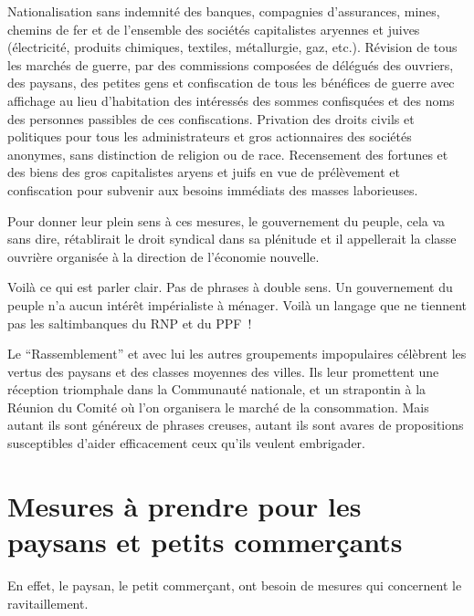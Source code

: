 \documentclass[french,twoside]{book} %
\newcommand{\bibl}[1]{{\RaggedLeft{#1}\par\bigskip}}
\newenvironment{quoteblock}%
  {\begin{quoting}}
  {\end{quoting}}
\newenvironment{quotebar}{%
    \def\FrameCommand{{\color{rubric!10!}\vrule width 0.5em} \hspace{0.9em}}%
    \def\OuterFrameSep{\itemsep} %
    \MakeFramed {\advance\hsize-\width \FrameRestore}
  }%
  {%
    \endMakeFramed
  }
\renewenvironment{quoteblock}%
  {%
    \savenotes
    \setstretch{0.9}
    \normalfont
    \begin{quotebar}
  }
  {%
    \end{quotebar}
    \spewnotes
  }
\begin{document}
\begin{quoteblock}
 \noindent Nationalisation sans indemnité des banques, compagnies d’assurances, mines, chemins de fer et de l’ensemble des sociétés capitalistes aryennes et juives (électricité, produits chimiques, textiles, métallurgie, gaz, etc.). Révision de tous les marchés de guerre, par des commissions composées de délégués des ouvriers, des paysans, des petites gens et confiscation de tous les bénéfices de guerre avec affichage au lieu d’habitation des intéressés des sommes confisquées et des noms des personnes passibles de ces confiscations. Privation des droits civils et politiques pour tous les administrateurs et gros actionnaires des sociétés anonymes, sans distinction de religion ou de race. Recensement des fortunes et des biens des gros capitalistes aryens et juifs en vue de prélèvement et confiscation pour subvenir aux besoins immédiats des masses laborieuses.\par
 
\bibl{(programme du parti communiste).}
 \end{quoteblock}

\noindent Pour donner leur plein sens à ces mesures, le gouvernement du peuple, cela va sans dire, rétablirait le droit syndical dans sa plénitude et il appellerait la classe ouvrière organisée à la direction de l’économie nouvelle.\par
Voilà ce qui est parler clair. Pas de phrases à double sens. Un gouvernement du peuple n’a aucun intérêt impérialiste à ménager. Voilà un langage que ne tiennent pas les saltimbanques du RNP et du PPF !\par
Le “Rassemblement” et avec lui les autres groupements impopulaires célèbrent les vertus des paysans et des classes moyennes des villes. Ils leur promettent une réception triomphale dans la Communauté nationale, et un strapontin à la Réunion du Comité où l’on organisera le marché de la consommation. Mais autant ils sont généreux de phrases creuses, autant ils sont avares de propositions susceptibles d’aider efficacement ceux qu’ils veulent embrigader.
\section[{Mesures à prendre pour les paysans et petits commerçants}]{Mesures à prendre pour les paysans et petits commerçants}
\noindent En effet, le paysan, le petit commerçant, ont besoin de mesures qui concernent le ravitaillement.\par
\end{document}
